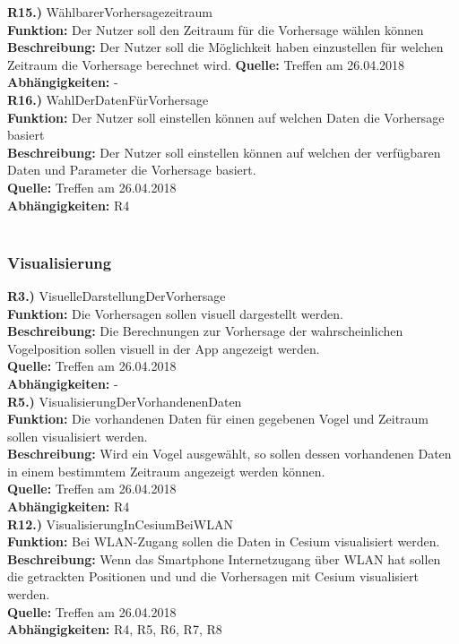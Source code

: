 \documentclass[12pt]{article} %
\begin{document}
\textbf{R15.)} WählbarerVorhersagezeitraum\\
\textbf{Funktion:} Der Nutzer soll den Zeitraum für die Vorhersage wählen können\\
\textbf{Beschreibung:} Der Nutzer soll die Möglichkeit haben einzustellen für welchen Zeitraum die Vorhersage berechnet wird.
\textbf{Quelle:} Treffen am 26.04.2018\\
\textbf{Abhängigkeiten:} - \\

\textbf{R16.)} WahlDerDatenFürVorhersage\\
\textbf{Funktion:} Der Nutzer soll einstellen können auf welchen Daten die Vorhersage basiert\\
\textbf{Beschreibung:} Der Nutzer soll einstellen können auf welchen der verfügbaren Daten und Parameter die Vorhersage basiert.\\
\textbf{Quelle:} Treffen am 26.04.2018\\
\textbf{Abhängigkeiten:} R4 \\
\\


\subsubsection{Visualisierung}

\textbf{R3.)} VisuelleDarstellungDerVorhersage \\
\textbf{Funktion:} Die Vorhersagen sollen visuell dargestellt werden. \\
\textbf{Beschreibung:} Die Berechnungen zur Vorhersage der wahrscheinlichen Vogelposition sollen visuell in der App angezeigt werden. \\
\textbf{Quelle:} Treffen am 26.04.2018 \\
\textbf{Abhängigkeiten:} - \\


\textbf{R5.)} VisualisierungDerVorhandenenDaten \\
\textbf{Funktion:} Die vorhandenen Daten für einen gegebenen Vogel und Zeitraum sollen visualisiert werden. \\
\textbf{Beschreibung:} Wird ein Vogel ausgewählt, so sollen dessen vorhandenen Daten in einem bestimmtem Zeitraum angezeigt werden können.\\
\textbf{Quelle:} Treffen am 26.04.2018 \\
\textbf{Abhängigkeiten:} R4 \\


\textbf{R12.)} VisualisierungInCesiumBeiWLAN\\
\textbf{Funktion:} Bei WLAN-Zugang sollen die Daten in Cesium visualisiert werden.\\
\textbf{Beschreibung:} Wenn das Smartphone Internetzugang über WLAN hat sollen die getrackten Positionen und und die Vorhersagen mit Cesium visualisiert werden.\\
\textbf{Quelle:} Treffen am 26.04.2018\\
\textbf{Abhängigkeiten:} R4, R5, R6, R7, R8\\
\end{document}
